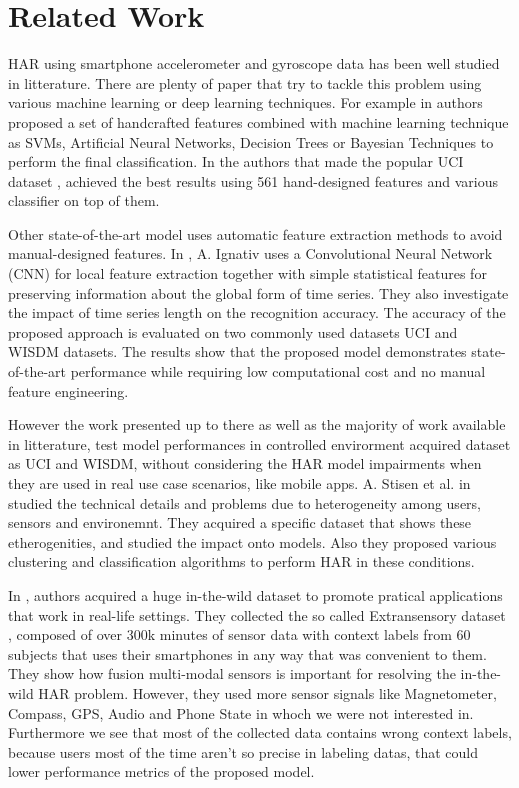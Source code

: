 
\section{Related Work}
\label{sec:related-work}

HAR using smartphone accelerometer and gyroscope data has been well studied in litterature. There are plenty of paper that try to tackle this problem using various machine learning or deep learning techniques. For example in \cite{frank2010reliable} authors proposed a set of handcrafted features combined with machine learning technique as SVMs, Artificial Neural Networks, Decision Trees or Bayesian Techniques to perform the final classification. In \cite{anguita2013public} the authors that made the popular UCI dataset \cite{UCI}, achieved the best results using 561 hand-designed features and various classifier on top of them.  

Other state-of-the-art model uses automatic feature extraction methods to avoid manual-designed features. In \cite{ignatov2018real}, A. Ignativ uses a Convolutional Neural
Network (CNN) for local feature extraction together with simple
statistical features for preserving information about the global form
of time series. They also investigate the impact of time series length
on the recognition accuracy. The accuracy of the proposed approach is
evaluated on two commonly used datasets UCI \cite{UCI} and WISDM \cite{WISDM} datasets. The results show that the proposed model
demonstrates state-of-the-art performance while requiring low
computational cost and no manual feature engineering.

However the work presented up to there as well as the majority of work available in litterature, test model performances in controlled envirorment acquired dataset as UCI and WISDM, without considering the HAR model impairments when they are used in real use case scenarios, like mobile apps. A. Stisen et al. in \cite{stisen2015smart} studied the technical details and
problems due to heterogeneity among users, sensors and
environemnt. They acquired a specific dataset that shows these etherogenities, and studied the impact onto models. Also they proposed various clustering and classification algorithms to perform HAR in these conditions.

In \cite{vaizman2018extrasensory}, authors acquired a huge in-the-wild dataset to promote pratical applications that work in real-life settings. They collected the so called Extransensory dataset \cite{EXTRASENSORY}, composed of over 300k minutes of sensor data with context labels from 60 subjects that uses their smartphones in any way that was convenient to them. They show how fusion multi-modal sensors is important for resolving the in-the-wild HAR problem.  However, they used more sensor signals like Magnetometer, Compass, GPS, Audio and Phone State in whoch we were not interested in. Furthermore we see that most of the collected data contains wrong context labels, because users most of the time aren't so precise in labeling datas, that could lower performance metrics of the proposed model.   

